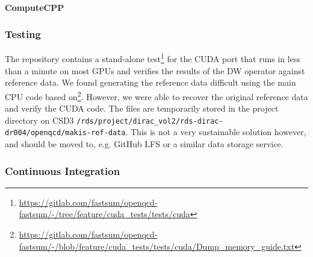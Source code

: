 \documentclass[../main]{subfiles}
\begin{document}
\paragraph{ComputeCPP}


\subsubsection{Testing}\label{testing_openqcd}

The repository contains a stand-alone test\footnote{\url{https://gitlab.com/fastsum/openqcd-fastsum/-/tree/feature/cuda_tests/tests/cuda}} for the CUDA port that runs in less than a minute on most GPUs and verifies the results of the DW operator against reference data.
We found generating the reference data difficult using the main CPU code based on\footnote{\url{https://gitlab.com/fastsum/openqcd-fastsum/-/blob/feature/cuda_tests/tests/cuda/Dump\_memory\_guide.txt}}.
However, we were able to recover the original reference data and verify the CUDA code.
The files are temporarily stored in the project directory on CSD3 \texttt{/rds/project/dirac\_vol2/rds-dirac-dr004/openqcd/makis-ref-data}.
This is not a very sustainable solution however, and should be moved to, e.g. GitHub LFS or a similar data storage service.

\subsubsection{Continuous Integration}
\end{document}
